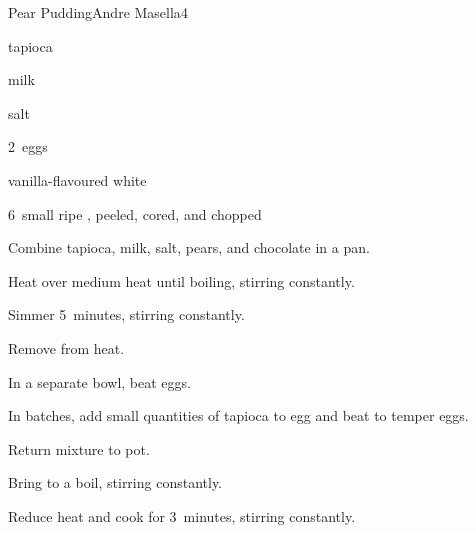 \begin{recipe}{Pear Pudding}{Andre Masella}{4}

\begin{ingredients}
\item \C{\half} tapioca
\item {} milk
\item \tp{\quarter} salt
\item 2~eggs
\item {} vanilla-flavoured white 
\item 6~small ripe , peeled, cored, and chopped
\end{ingredients}

\begin{directions}
\item Combine tapioca, milk, salt, pears, and chocolate in a pan.
\item Heat over medium heat until boiling, stirring constantly.
\item Simmer 5~minutes, stirring constantly.
\item Remove from heat.
\item In a separate bowl, beat eggs.
\item In batches, add small quantities of tapioca to egg and beat to temper eggs.
\item Return mixture to pot.
\item Bring to a boil, stirring constantly.
\item Reduce heat and cook for 3~minutes, stirring constantly.
\end{directions}

\end{recipe}
